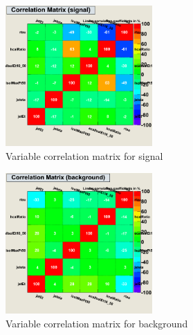 \begin{figure}[h]
\begin{center}
\includegraphics[width=0.5\textwidth]{images/ahCorrelationMatrixS.png}
\caption{Variable correlation matrix for signal}
\label{fig:ahCorrelationMatrixS}
\end{center}
\end{figure}

\begin{figure}[h]

\begin{center}
\includegraphics[width=0.5\textwidth]{images/ahCorrelationMatrixB.png}
\caption{Variable correlation matrix for background}
\label{fig:ahCorrelationMatrixB}
\end{center}
\end{figure}

